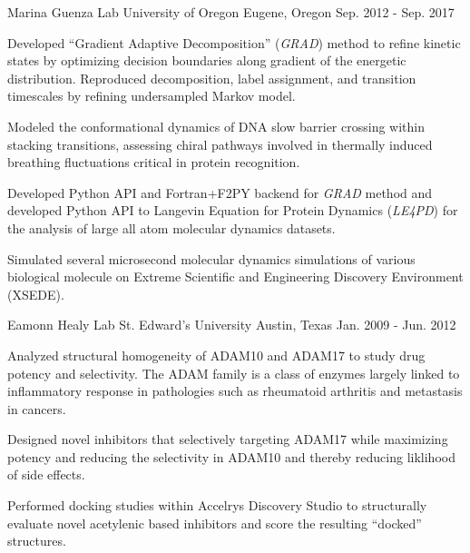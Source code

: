 

\begin{cventries}
  \cventry
    {Marina Guenza Lab}
    {University of Oregon}
    {Eugene, Oregon}
    {Sep. 2012 - Sep. 2017}
    {
      \begin{cvitems}
        \item{Developed ``Gradient Adaptive Decomposition'' (\emph{GRAD}) method to refine kinetic states by optimizing decision boundaries along gradient of the energetic distribution. Reproduced decomposition, label assignment, and transition timescales by refining undersampled Markov model.}
        \item{Modeled the conformational dynamics of DNA slow barrier crossing within stacking transitions, assessing chiral pathways involved in thermally induced breathing fluctuations critical in protein recognition.}
        \item{Developed Python API and Fortran+F2PY backend for \emph{GRAD} method and developed Python API to Langevin Equation for Protein Dynamics (\emph{LE4PD}) for the analysis of large all atom molecular dynamics datasets.}
        \item{Simulated several microsecond molecular dynamics simulations of various biological molecule on Extreme Scientific and Engineering Discovery Environment (XSEDE).}
    \end{cvitems}
    }

  \cventry
    {Eamonn Healy Lab}
    {St. Edward's University}
    {Austin, Texas}
    {Jan. 2009 - Jun. 2012}
    {
      \begin{cvitems}
        \item{Analyzed structural homogeneity of ADAM10 and ADAM17 to study drug potency and selectivity. The ADAM family is a class of enzymes largely linked to inflammatory response in pathologies such as rheumatoid arthritis and metastasis in cancers.}
        \item{Designed novel inhibitors that selectively targeting ADAM17 while maximizing potency and reducing the selectivity in ADAM10 and thereby reducing liklihood of side effects.}
        \item{Performed docking studies within Accelrys Discovery Studio to structurally evaluate novel acetylenic based inhibitors and score the resulting ``docked'' structures.}
      \end{cvitems}
    }
\end{cventries}

